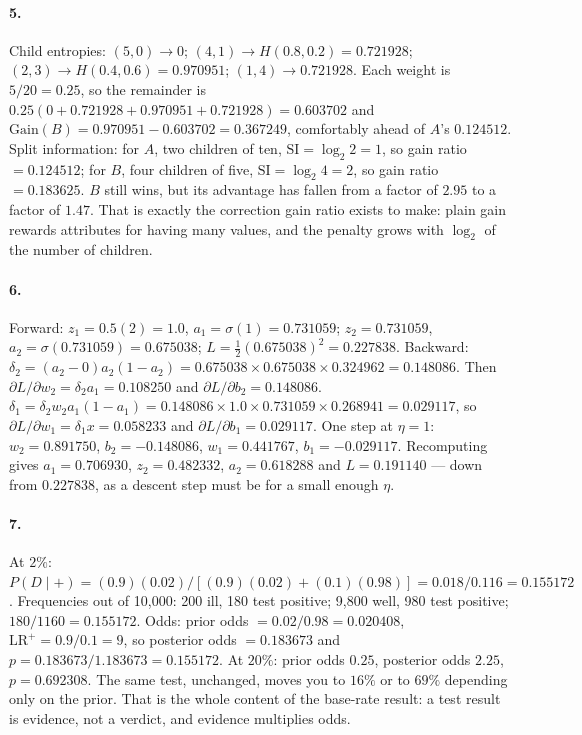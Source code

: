 \documentclass[11pt]{article}
\begin{document}
\paragraph{5.} Child entropies: $(5,0) \to 0$; $(4,1) \to H(0.8,0.2) =
0.721928$; $(2,3) \to H(0.4,0.6) = 0.970951$; $(1,4) \to 0.721928$. Each
weight is $5/20 = 0.25$, so the remainder is $0.25(0 + 0.721928 + 0.970951 +
0.721928) = 0.603702$ and $\mathrm{Gain}(B) = 0.970951 - 0.603702 =
0.367249$, comfortably ahead of $A$'s $0.124512$. Split information:
for $A$, two children of ten, $\mathrm{SI} = \log_2 2 = 1$, so gain ratio
$= 0.124512$; for $B$, four children of five,
$\mathrm{SI} = \log_2 4 = 2$, so gain ratio $= 0.183625$. $B$ still wins, but
its advantage has fallen from a factor of $2.95$ to a factor of $1.47$. That
is exactly the correction gain ratio exists to make: plain gain rewards
attributes for having many values, and the penalty grows with $\log_2$ of the
number of children.

\paragraph{6.} Forward: $z_1 = 0.5(2) = 1.0$, $a_1 = \sigma(1) = 0.731059$;
$z_2 = 0.731059$, $a_2 = \sigma(0.731059) = 0.675038$;
$L = \tfrac12(0.675038)^2 = 0.227838$.
Backward: $\delta_2 = (a_2 - 0)a_2(1 - a_2) = 0.675038 \times 0.675038
\times 0.324962 = 0.148086$. Then
$\partial L/\partial w_2 = \delta_2 a_1 = 0.108250$ and
$\partial L/\partial b_2 = 0.148086$.
$\delta_1 = \delta_2 w_2 a_1(1 - a_1) = 0.148086 \times 1.0 \times 0.731059
\times 0.268941 = 0.029117$, so
$\partial L/\partial w_1 = \delta_1 x = 0.058233$ and
$\partial L/\partial b_1 = 0.029117$.
One step at $\eta = 1$: $w_2 = 0.891750$, $b_2 = -0.148086$,
$w_1 = 0.441767$, $b_1 = -0.029117$. Recomputing gives $a_1 = 0.706930$,
$z_2 = 0.482332$, $a_2 = 0.618288$ and $L = 0.191140$ --- down from
$0.227838$, as a descent step must be for a small enough $\eta$.

\paragraph{7.} At $2\%$:
$P(D\mid+) = (0.9)(0.02)/[(0.9)(0.02) + (0.1)(0.98)] = 0.018/0.116 =
0.155172$. Frequencies out of 10{,}000: 200 ill, 180 test positive; 9{,}800
well, 980 test positive; $180/1160 = 0.155172$. Odds:
prior odds $= 0.02/0.98 = 0.020408$, $\mathrm{LR}^{+} = 0.9/0.1 = 9$, so
posterior odds $= 0.183673$ and $p = 0.183673/1.183673 = 0.155172$.
At $20\%$: prior odds $0.25$, posterior odds $2.25$, $p = 0.692308$. The same
test, unchanged, moves you to $16\%$ or to $69\%$ depending only on the
prior. That is the whole content of the base-rate result: a test result is
evidence, not a verdict, and evidence multiplies odds.
\end{document}
